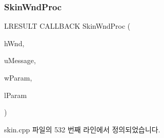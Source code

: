 \subsubsection{\texorpdfstring{Skin\+Wnd\+Proc}{SkinWndProc}}
{\footnotesize\ttfamily L\+R\+E\+S\+U\+LT C\+A\+L\+L\+B\+A\+CK Skin\+Wnd\+Proc (\begin{DoxyParamCaption}\item[{H\+W\+ND}]{h\+Wnd,  }\item[{U\+I\+NT}]{u\+Message,  }\item[{W\+P\+A\+R\+AM}]{w\+Param,  }\item[{L\+P\+A\+R\+AM}]{l\+Param }\end{DoxyParamCaption})\hspace{0.3cm}{\ttfamily [friend]}}



skin.\+cpp 파일의 532 번째 라인에서 정의되었습니다.


